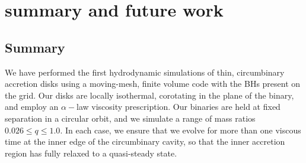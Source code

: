 \documentclass[apj]{emulateapj}
\begin{document}
\section{summary and future work}
\label{sec:conclusions}
\subsection{Summary}
We have performed the first hydrodynamic simulations of thin, circumbinary accretion disks using a moving-mesh, finite volume code with the BHs present on the grid. Our disks are locally isothermal, corotating in the plane of the binary, and employ an $\alpha-$law viscosity prescription. Our binaries are held at fixed separation in a circular orbit, and we simulate a range of mass ratios $0.026 \le q \le 1.0$. In each case, we ensure that we evolve for more than one viscous time at the inner edge of the circumbinary cavity, so that the inner accretion region has fully relaxed to a quasi-steady state.
\end{document}

